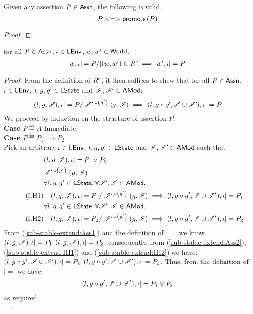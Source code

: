 \begin{lemma}\label{lem:existential-promotion}
Given any assertion $P \in \textsf{Assn}$, the following is valid.
%
\[
	P <=> \textsf{promote}\left(P\right)
\]
%
\begin{proof}
\todo
\end{proof}
\end{lemma}
%
%
\begin{lemma}[]\label{lem:sub-stable-extend}
for all $P \in \textsf{Assn}$, $\iota \in \textsf{LEnv}$, $w, w' \in \textsf{World}$, 
% 
\[
\begin{array}{@{} l @{}}
	w, \lenv |= P /| (w, w') \in \extendR 
	\implies  w', \lenv |= P
\end{array}
\]
%
\begin{proof}
From the definition of $R^{\textsf{e}}$, it then suffices to show that for all $P \in \textsf{Assn}$, $\iota \in \textsf{LEnv}$, $l, g, g' \in \textsf{LState}$ and $\mathscr{I}, \mathscr{I}' \in \textsf{AMod}$: 
% 
\[
\begin{array}{@{} l @{}}
	(l, g, \lmod), \lenv |= P /| 
	\expandsAM{\lmod'}{g'}{g}{\lmod}
	 \implies  (l, g \composeL g', \lmod \cup \lmod'), \lenv |= P
\end{array}
\]
%
We proceed by induction on the structure of assertion $P$.	\\

\noindent\textbf{Case $P \eqdef A$\quad} Immediate.\\
\noindent\textbf{Case $P \eqdef P_1 \implies P_2$} \\
Pick an arbitrary $\iota \in \textsf{LEnv}$, $l, g, g' \in \textsf{LState}$ and $\mathscr{I}, \mathscr{I}' \in \textsf{AMod}$ such that
%
\begin{align}
	& (l, g, \lmod), \lenv |= P_1 \lor P_2 \label{sub-stable-extend:Ass1}\\
%	
	&\expandsAM{\lmod'}{g'}{g}{\lmod} \label{sub-stable-extend:Ass2}\\
%	
	& \for{l, g, g' \in \LStates} \for{\lmod', \lmod\in \AMods} \nonumber\\
	\tag{I.H1} & 
	\quad (l, g, \lmod), \lenv |= P_1 /| \expandsAM{\lmod'}{g'}{g}{\lmod} \implies (l, g \composeL g', \lmod \cup \lmod'), \lenv |= P_1 \label{sub-stable-extend:IH1}\\ 
%
	& \for{l, g, g' \in \LStates} \for{\lmod', \lmod \in \AMods} \nonumber\\
	\tag{I.H2} & 
	\quad (l, g, \lmod), \lenv |= P_2 /| \expandsAM{\lmod'}{g'}{g}{\lmod} \implies (l, g \composeL g', \lmod \cup \lmod'), \lenv |= P_2 \label{sub-stable-extend:IH2}
%	
\end{align}
%
From (\ref{sub-stable-extend:Ass1}) and the definition of $|=$ we know $(l, g, \mathscr{I}), \iota |= P_1$  $(l, g, \mathscr{I}), \iota |= P_2$; consequently, from (\ref{sub-stable-extend:Ass2}), (\ref{sub-stable-extend:IH1}) and (\ref{sub-stable-extend:IH2}) we have: $(l, g \circ g', \mathscr{I} \cup \mathscr{I}'), \iota |= P_1$  $(l, g \circ g', \mathscr{I} \cup \mathscr{I}'), \iota |= P_2$. Thus, from the definition of $|=$ we have:
%
\begin{align*}
	(l, g \circ g', \mathscr{I} \cup \mathscr{I}'), \iota |= P_1 \lor P_2
\end{align*}
%
as required.\\


\end{proof}
\end{lemma}
